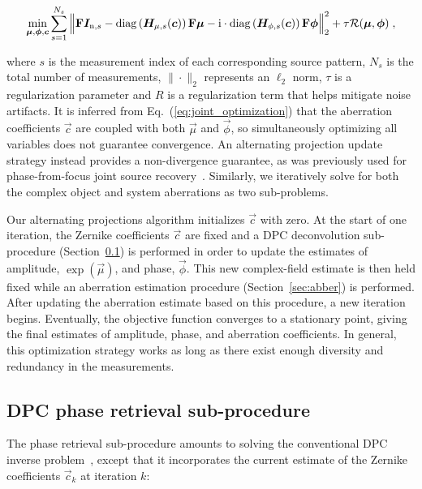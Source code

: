 \begin{equation}
\label{eq:joint_optimization}
\underset{\bm{\mu},\bm{\phi},\bm{c}}{\mathrm{min}} \sum_{s = 1}^{N_{s}} \Big\|\boldsymbol{\mathbf{F}}\bm{I}_{\mathrm{n},s} - \mathrm{diag}\left(\bm{H}_{\mu,s}(\bm{c})\right)\boldsymbol{\mathbf{F}}\bm{\mu} -\mathrm{i}\cdot\mathrm{diag}\left(\bm{H}_{\phi,s}(\bm{c})\right)\boldsymbol{\mathbf{F}}\bm{\phi}\Big\|_{2}^{2} + \tau \mathcal{R}(\bm{\mu},\bm{\phi})\;,
\end{equation}

\noindent where $s$ is the measurement index of each corresponding source pattern, $N_{s}$ is the total number of measurements, $\|\cdot\|_{2}$ represents an $\ell_{2}$ norm, $\tau$ is a regularization parameter and $R$ is a regularization term that helps mitigate noise artifacts. It is inferred from Eq.~(\ref{eq:joint_optimization}) that the aberration coefficients $\vec{c}$ are coupled with both $\vec{\mu}$ and $\vec{\phi}$, so simultaneously optimizing all variables does not guarantee convergence. An alternating projection update strategy instead provides a non-divergence guarantee, as was previously used for phase-from-focus joint source recovery~\cite{zhong2016nonlinear}. Similarly, we iteratively solve for both the complex object and system aberrations as two sub-problems.

Our alternating projections algorithm initializes $\vec{c}$ with zero. At the start of one iteration, the Zernike coefficients $\vec{c}$ are fixed and a DPC deconvolution sub-procedure (Section~\ref{sec:phase}) is performed in order to update the estimates of amplitude, $\exp(\vec{\mu})$, and phase, $\vec{\phi}$. This new complex-field estimate is then held fixed while an aberration estimation procedure (Section~\ref{sec:abber}) is performed. After updating the aberration estimate based on this procedure, a new iteration begins. Eventually, the objective function converges to a stationary point, giving the final estimates of amplitude, phase, and aberration coefficients. In general, this optimization strategy works as long as there exist enough diversity and redundancy in the measurements.

\subsection{DPC phase retrieval sub-procedure}\label{sec:phase}
The phase retrieval sub-procedure amounts to solving the conventional DPC inverse problem~\cite{tian2015quantitative,PhillipsChen17cDPC}, except that it incorporates the current estimate of the Zernike coefficients $\vec{c}_k$ at iteration $k$:

